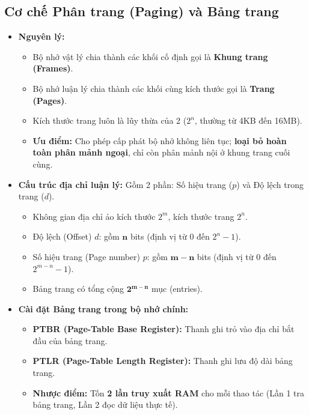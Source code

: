 \documentclass[11pt,a4paper]{article}
\begin{document}
\subsection{Cơ chế Phân trang (Paging) và Bảng trang}
\begin{itemize}
    \item \textbf{Nguyên lý:}
    \begin{itemize}[noitemsep]
        \item Bộ nhớ vật lý chia thành các khối cố định gọi là \textbf{Khung trang (Frames)}.
        \item Bộ nhớ luận lý chia thành các khối cùng kích thước gọi là \textbf{Trang (Pages)}.
        \item Kích thước trang luôn là lũy thừa của 2 ($2^n$, thường từ 4KB đến 16MB).
        \item \textbf{Ưu điểm:} Cho phép cấp phát bộ nhớ không liên tục; \textbf{loại bỏ hoàn toàn phân mảnh ngoại}, chỉ còn phân mảnh nội ở khung trang cuối cùng.
    \end{itemize}
    \item \textbf{Cấu trúc địa chỉ luận lý:} Gồm 2 phần: Số hiệu trang ($p$) và Độ lệch trong trang ($d$).
    \begin{itemize}[noitemsep]
        \item Không gian địa chỉ ảo kích thước $2^m$, kích thước trang $2^n$.
        \item Độ lệch (Offset) $d$: gồm $\mathbf{n}$ bits (định vị từ $0$ đến $2^n - 1$).
        \item Số hiệu trang (Page number) $p$: gồm $\mathbf{m - n}$ bits (định vị từ $0$ đến $2^{m-n} - 1$).
        \item Bảng trang có tổng cộng $\mathbf{2^{m-n}}$ mục (entries).
    \end{itemize}
    \item \textbf{Cài đặt Bảng trang trong bộ nhớ chính:}
    \begin{itemize}[noitemsep]
        \item \textbf{PTBR (Page-Table Base Register):} Thanh ghi trỏ vào địa chỉ bắt đầu của bảng trang.
        \item \textbf{PTLR (Page-Table Length Register):} Thanh ghi lưu độ dài bảng trang.
        \item \textbf{Nhược điểm:} Tốn \textbf{2 lần truy xuất RAM} cho mỗi thao tác (Lần 1 tra bảng trang, Lần 2 đọc dữ liệu thực tế).
    \end{itemize}
\end{itemize}
\end{document}
